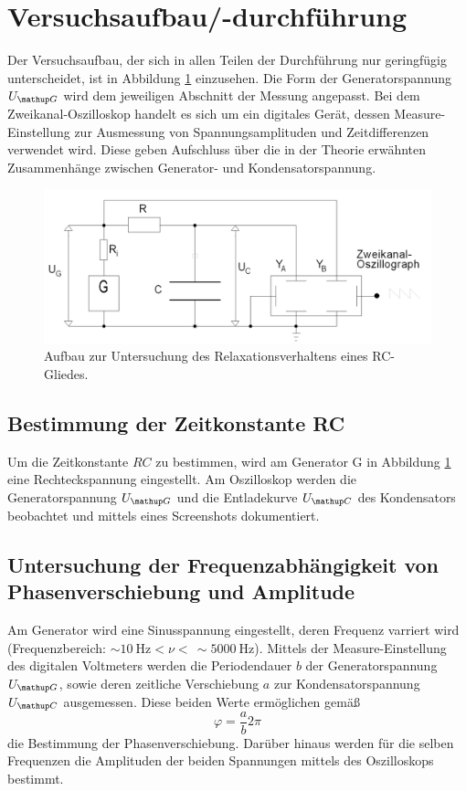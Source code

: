 \section{Versuchsaufbau/-durchführung}
Der Versuchsaufbau, der sich in allen Teilen der Durchführung nur geringfügig unterscheidet, ist in Abbildung \ref{fig: aufbau} einzusehen. %
Die Form der Generatorspannung $U\ua{G}$ wird dem jeweiligen Abschnitt der Messung angepasst. Bei dem Zweikanal-Oszilloskop handelt es sich um ein %
digitales Gerät, dessen Measure-Einstellung zur Ausmessung von Spannungsamplituden und Zeitdifferenzen verwendet wird. Diese geben Aufschluss über
die in der Theorie erwähnten Zusammenhänge zwischen Generator- und Kondensatorspannung.
\begin{figure}
  \centering
  \includegraphics[width = \textwidth]{pics/aufbau.png}
  \caption{Aufbau zur Untersuchung des Relaxationsverhaltens eines RC-Gliedes.}
  \label{fig: aufbau}
\end{figure}

\subsection{Bestimmung der Zeitkonstante RC}
Um die Zeitkonstante $RC$ zu bestimmen, wird am Generator G in Abbildung \ref{fig: aufbau} eine Rechteckspannung eingestellt.
Am Oszilloskop werden die Generatorspannung $U\ua{G}$ und die Entladekurve $U\ua{C}$ des Kondensators beobachtet und mittels eines Screenshots %
dokumentiert.

\subsection{Untersuchung der Frequenzabhängigkeit von Phasenverschiebung und Amplitude}
Am Generator wird eine Sinusspannung eingestellt, deren Frequenz varriert wird (Frequenzbereich: $\sim\SI{10}{\hertz}<\nu<\, \sim\SI{5000}{\hertz}$). %
Mittels der Measure-Einstellung des digitalen Voltmeters werden die Periodendauer $b$ der
Generatorspannung $U\ua{G}$, sowie deren zeitliche Verschiebung $a$ zur Kondensatorspannung $U\ua{C}$ ausgemessen. Diese beiden Werte ermöglichen gemäß
\begin{equation}
  \varphi = \frac{a}{b}2\pi
  \label{eq:phasenverschiebung}
\end{equation}
die Bestimmung der Phasenverschiebung. Darüber hinaus werden für die selben Frequenzen die Amplituden der beiden Spannungen mittels des Oszilloskops
bestimmt.

